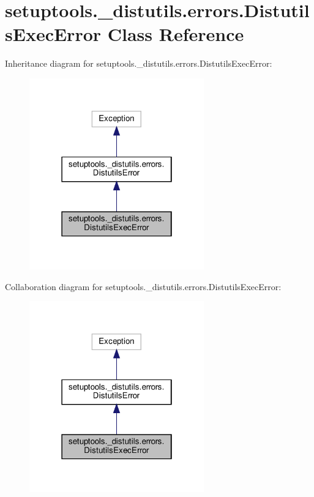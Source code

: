 \hypertarget{classsetuptools_1_1__distutils_1_1errors_1_1DistutilsExecError}{}\section{setuptools.\+\_\+distutils.\+errors.\+Distutils\+Exec\+Error Class Reference}
\label{classsetuptools_1_1__distutils_1_1errors_1_1DistutilsExecError}


Inheritance diagram for setuptools.\+\_\+distutils.\+errors.\+Distutils\+Exec\+Error\+:
\nopagebreak
\begin{figure}[H]
\begin{center}
\leavevmode
\includegraphics[width=214pt]{classsetuptools_1_1__distutils_1_1errors_1_1DistutilsExecError__inherit__graph}
\end{center}
\end{figure}


Collaboration diagram for setuptools.\+\_\+distutils.\+errors.\+Distutils\+Exec\+Error\+:
\nopagebreak
\begin{figure}[H]
\begin{center}
\leavevmode
\includegraphics[width=214pt]{classsetuptools_1_1__distutils_1_1errors_1_1DistutilsExecError__coll__graph}
\end{center}
\end{figure}


